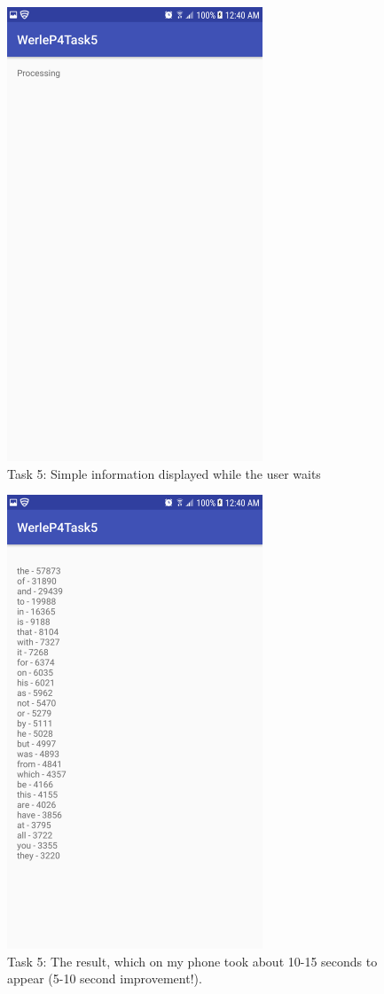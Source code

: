\documentclass[11pt]{article}
\begin{document}
		\begin{figure}[ht]
			\includegraphics[width=3in]{img/t5s3.png}
			\centering
			\caption{Task 5: Simple information displayed while the user waits}
		\end{figure}
		\begin{figure}[ht]
			\includegraphics[width=3in]{img/t5s4.png}
			\centering
			\caption{Task 5: The result, which on my phone took about 10-15 seconds to appear (5-10 second improvement!).}
		\end{figure}
\end{document}
